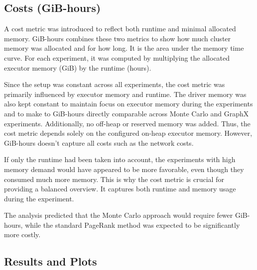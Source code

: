 \subsection{Costs (GiB-hours)}
A cost metric was introduced to reflect both runtime and minimal allocated memory. GiB-hours combines these two metrics to show how much cluster memory was allocated and for how long. It is the area under the memory time curve. For each experiment, it was computed by multiplying the allocated executor memory (GiB) by the runtime (hours). \par
Since the setup was constant across all experiments, the cost metric was primarily influenced by executor memory and runtime. The driver memory was also kept constant to maintain focus on executor memory during the experiments and to make to GiB-hours directly comparable across Monte Carlo and GraphX experiments. Additionally, no off-heap or reserved memory was added. Thus, the cost metric depends solely on the configured on-heap executor memory. However, GiB-hours doesn't capture all costs such as the network costs.\par
If only the runtime had been taken into account, the experiments with high memory demand would have appeared to be more favorable, even though they consumed much more memory. This is why the cost metric is crucial for providing a balanced overview. It captures both runtime and memory usage during the experiment. \par
The analysis predicted that the Monte Carlo approach would require fewer GiB-hours, while the standard PageRank method was expected to be significantly more costly.


\subsection{Results and Plots}

